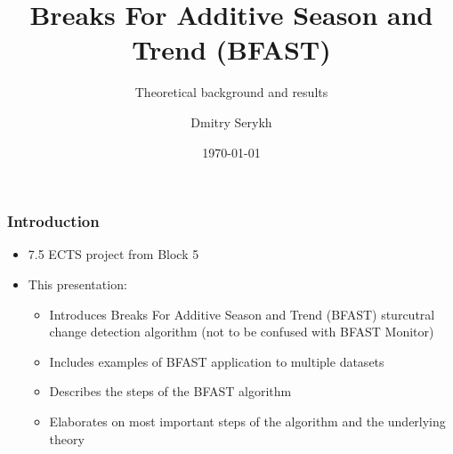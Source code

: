 \documentclass[9pt]{beamer}
\title{Breaks For Additive Season and Trend (BFAST)}
\subtitle{Theoretical background and results}
\institute{Department of Computer Science}
\author{Dmitry Serykh}
\date{\today}
\begin{document}
\frame[plain]{\titlepage}



\begin{frame}
\frametitle{Introduction}
\begin{itemize}
\item 7.5 ECTS project from Block 5
\item This presentation:
\begin{itemize}
  \item Introduces Breaks For Additive Season and Trend (BFAST) sturcutral change
    detection algorithm (not to be confused with BFAST Monitor)
  \item Includes examples of BFAST application to multiple datasets
  \item Describes the steps of the BFAST algorithm
  \item Elaborates on most important steps of the algorithm and the underlying theory
\end{itemize}
\end{itemize}
\end{frame}







\end{document}
